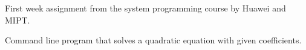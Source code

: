 First week assignment from the system programming course by Huawei and MIPT.

Command line program that solves a quadratic equation with given coefficients. 